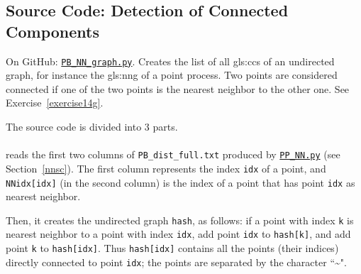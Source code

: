 \documentclass[10pt]{article}
\begin{document}
\subsection{Source Code: Detection of Connected Components}\label{scc}

{On GitHub}: \href{https://github.com/VincentGranville/Point-Processes/blob/main/Source\%20Code/PB_NN_graph.py}{\texttt{PB\_NN\_graph.py}}. Creates the list of all 
\glspl{gls:cc} of an 
\textcolor{index}{undirected graph}, 
for instance the  \gls{gls:nng} of a point process. Two points are considered connected if one of the two points is the nearest neighbor to the other one. 
See Exercise~\ref{exercise14g}.  

\noindent The source code is divided into 3 parts. \\
\quad \\
 reads the first two columns of \texttt{PB\_dist\_full.txt} produced by 
\href{https://github.com/VincentGranville/Point-Processes/blob/main/Source\%20Code/PB_NN.py}{\texttt{PP\_NN.py}} (see Section~\ref{nnsc}). The first column represents the index 
\texttt{idx} of a point, and \texttt{NNidx[idx]} (in the second column) is the index of a point that has point \texttt{idx} as nearest neighbor. 

\noindent Then, it creates the undirected graph \texttt{hash}, as follows:  if a point with index \texttt{k} is nearest neighbor to a point with index 
\texttt{idx}, add point \texttt{idx} to 
\texttt{hash[k]}, and add point \texttt{k} to \texttt{hash[idx]}. 
Thus \texttt{hash[idx]} contains all the points (their indices) directly connected to point \texttt{idx}; the points are separated
by the character ``\textasciitilde". 
\end{document}

